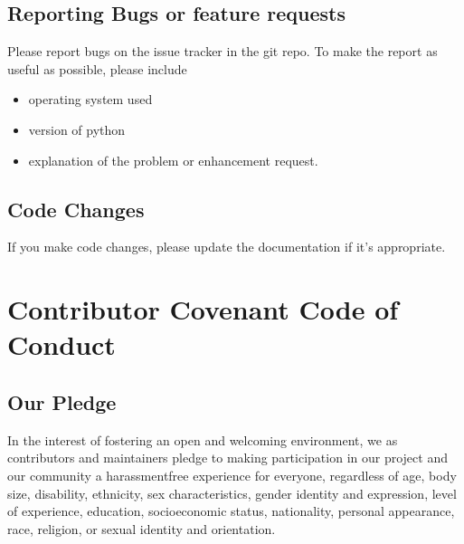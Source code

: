 \documentclass[letterpaper,10pt,english]{sphinxmanual}
\begin{document}
\section{Reporting Bugs or feature requests}
\label{\detokenize{Contributing:reporting-bugs-or-feature-requests}}
\sphinxAtStartPar
Please report bugs on the issue tracker in the git repo.
To make the report as useful as possible, please include
\begin{itemize}
\item {} 
\sphinxAtStartPar
operating system used

\item {} 
\sphinxAtStartPar
version of python

\item {} 
\sphinxAtStartPar
explanation of the problem or enhancement request.

\end{itemize}


\section{Code Changes}
\label{\detokenize{Contributing:code-changes}}
\sphinxAtStartPar
If you make code changes, please update the documentation if
it’s appropriate.
\begin{quote}
\end{quote}

\sphinxstepscope


\chapter{Contributor Covenant Code of Conduct}
\label{\detokenize{Code-of-conduct:contributor-covenant-code-of-conduct}}\label{\detokenize{Code-of-conduct:code-of-conduct}}\label{\detokenize{Code-of-conduct::doc}}

\section{Our Pledge}
\label{\detokenize{Code-of-conduct:our-pledge}}
\sphinxAtStartPar
In the interest of fostering an open and welcoming environment, we as
contributors and maintainers pledge to making participation in our project and
our community a harassment\sphinxhyphen{}free experience for everyone, regardless of age, body
size, disability, ethnicity, sex characteristics, gender identity and
expression, level of experience, education, socio\sphinxhyphen{}economic status, nationality,
personal appearance, race, religion, or sexual identity and orientation.
\end{document}
